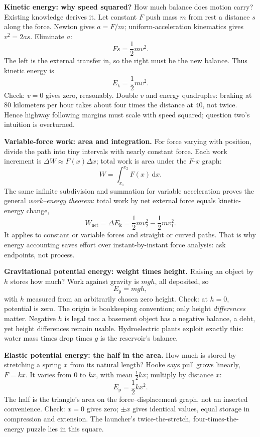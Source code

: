 \textbf{Kinetic energy: why speed squared?} How much balance does motion carry? Existing knowledge derives it. Let constant \(F\) push mass \(m\) from rest a distance \(s\) along the force. Newton gives \(a=F/m\); uniform-acceleration kinematics gives \(v^2=2as\). Eliminate \(a\):
\[
Fs=\frac{1}{2}mv^2 .
\]
The left is the external transfer in, so the right must be the new balance. Thus kinetic energy is
\[
E_{\mathrm k}=\frac{1}{2}mv^2 .
\]
Check: \(v=0\) gives zero, reasonably. Double \(v\) and energy quadruples: braking at \(80\) kilometers per hour takes about four times the distance at \(40\), not twice. Hence highway following margins must scale with speed squared; question two's intuition is overturned.

\begin{mathbridge}
\textbf{Variable-force work: area and integration.} For force varying with position, divide the path into tiny intervals with nearly constant force. Each work increment is \(\Delta W\approx F(x)\Delta x\); total work is area under the \(F\)-\(x\) graph:
\[
W=\int_{x_1}^{x_2}F(x)\,\mathrm dx .
\]
The same infinite subdivision and summation for variable acceleration proves the general \emph{work--energy theorem}: total work by net external force equals kinetic-energy change,
\[
W_{\text{net}}=\Delta E_{\mathrm k}=\frac{1}{2}mv_2^2-\frac{1}{2}mv_1^2 .
\]
It applies to constant or variable forces and straight or curved paths. That is why energy accounting saves effort over instant-by-instant force analysis: ask endpoints, not process.
\end{mathbridge}

\textbf{Gravitational potential energy: weight times height.} Raising an object by \(h\) stores how much? Work against gravity is \(mgh\), all deposited, so
\[
E_{\mathrm p}=mgh ,
\]
with \(h\) measured from an arbitrarily chosen zero height. Check: at \(h=0\), potential is zero. The origin is bookkeeping convention; only height \emph{differences} matter. Negative \(h\) is legal too: a basement object has a negative balance, a debt, yet height differences remain usable. Hydroelectric plants exploit exactly this: water mass times drop times \(g\) is the reservoir's balance.

\textbf{Elastic potential energy: the half in the area.} How much is stored by stretching a spring \(x\) from its natural length? Hooke says pull grows linearly, \(F=kx\). It varies from \(0\) to \(kx\), with mean \(\frac{1}{2}kx\); multiply by distance \(x\):
\[
E_{\mathrm p}=\frac{1}{2}kx^2 .
\]
The half is the triangle's area on the force--displacement graph, not an inserted convenience. Check: \(x=0\) gives zero; \(\pm x\) gives identical values, equal storage in compression and extension. The launcher's twice-the-stretch, four-times-the-energy puzzle lies in this square.

